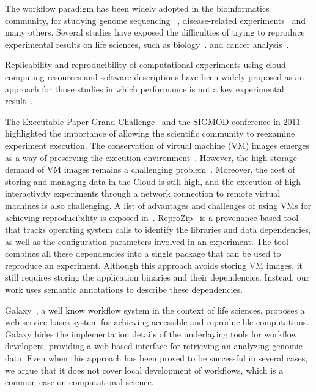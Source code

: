 The workflow paradigm has been widely adopted in the bioinformatics community, for studying genome sequencing ~\cite{blankenberg2010galaxy, giardine2005galaxy, kepler-clotho}, disease-related experiments~\cite{fisher2009systematic, gaizauskas2004} and many others. Several studies have exposed the difficulties of trying to reproduce experimental results on life sciences, such as biology~\cite{Ioannidis2009}. and cancer analysis~\cite{ErringtonCancerRerpoducibility}.

Replicability and reproducibility of computational experiments using cloud computing resources and software descriptions have been widely proposed as an approach for those studies in which performance is not a key experimental result~\cite{Crick14}.

The Executable Paper Grand Challenge~\cite{elsevierchallenge} and the SIGMOD conference in 2011~\cite{SIGMOD} highlighted the importance of allowing the scientific community to reexamine experiment execution. The conservation of virtual machine (VM) images emerges as a way of preserving the execution environment~\cite{Brammer,SHARE}. However, the high storage demand of VM images remains a challenging problem~\cite{Mao:2014:ROD:2600090.2512348,6552826}. Moreover, the cost of storing and managing data in the Cloud is still high, and the execution of high-interactivity experiments through a network connection to remote virtual machines is also challenging. A list of advantages and challenges of using VMs for achieving reproducibility is exposed in~\cite{Howe2012}. ReproZip~\cite{reprozip} is a provenance-based tool that tracks operating system calls to identify the libraries and data dependencies, as well as the configuration parameters involved in an experiment. The tool combines all these dependencies into a single package that can be used to reproduce an experiment. Although this approach avoids storing VM images, it still requires storing the application binaries and their dependencies. Instead, our work uses semantic annotations to describe these dependencies.


Galaxy~\cite{goecks2010galaxy}, a well know workflow system in the context of life sciences, proposes a web-service bases system for achieving accessible and reproducible computations. Galaxy hides the implementation details of the underlaying tools for workflow developers, providing a web-based interface for retrieving an analyzing genomic data. Even when this approach has been proved to be successful in several cases, we argue that it does not cover local development of workflows, which is a common case on computational science.  


